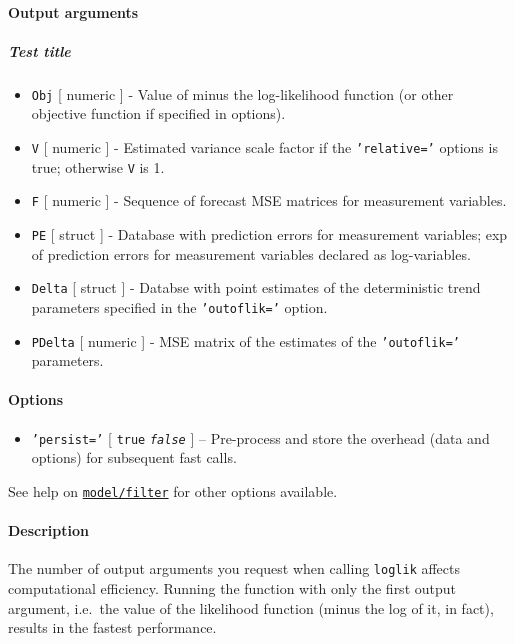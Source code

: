 \paragraph{Output arguments}

\subparagraph{Test title}

\begin{itemize}
\item
  \texttt{Obj} {[} numeric {]} - Value of minus the log-likelihood
  function (or other objective function if specified in options).
\item
  \texttt{V} {[} numeric {]} - Estimated variance scale factor if the
  \texttt{'relative='} options is true; otherwise \texttt{V} is 1.
\item
  \texttt{F} {[} numeric {]} - Sequence of forecast MSE matrices for
  measurement variables.
\item
  \texttt{PE} {[} struct {]} - Database with prediction errors for
  measurement variables; exp of prediction errors for measurement
  variables declared as log-variables.
\item
  \texttt{Delta} {[} struct {]} - Databse with point estimates of the
  deterministic trend parameters specified in the \texttt{'outoflik='}
  option.
\item
  \texttt{PDelta} {[} numeric {]} - MSE matrix of the estimates of the
  \texttt{'outoflik='} parameters.
\end{itemize}

\paragraph{Options}

\begin{itemize}
\itemsep1pt\parskip0pt
\item
  \texttt{'persist='} {[} \texttt{true} \textbar{} \emph{\texttt{false}}
  {]} -- Pre-process and store the overhead (data and options) for
  subsequent fast calls.
\end{itemize}

See help on \href{model/filter}{\texttt{model/filter}} for other options
available.

\paragraph{Description}

The number of output arguments you request when calling \texttt{loglik}
affects computational efficiency. Running the function with only the
first output argument, i.e.~the value of the likelihood function (minus
the log of it, in fact), results in the fastest performance.


